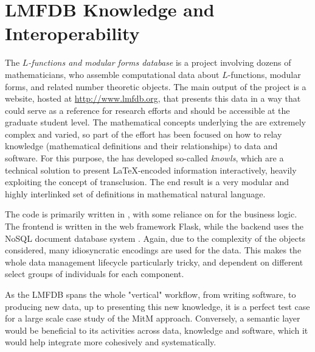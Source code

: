 \section{LMFDB Knowledge and Interoperability}\label{sec:lmfdb}
The \emph{$L$-functions and modular forms database} is a project involving dozens of
mathematicians, who assemble computational data about $L$-functions, modular forms, and
related number theoretic objects. The main output of the project is a website, hosted at
\url{http://www.lmfdb.org}, that presents this data in a way that could serve as a
reference for research efforts and should be accessible at the graduate student level.
The mathematical concepts underlying the \LMFDB are extremely complex and varied, so part
of the effort has been focused on how to relay knowledge (mathematical definitions and their
relationships) to data and software. For this purpose, the \LMFDB has developed so-called
\emph{knowls}, which are a technical solution to present \LaTeX-encoded information
interactively, heavily exploiting the concept of transclusion. The end result is a
very modular and highly interlinked set of definitions in mathematical natural language.


The \LMFDB code is primarily written in \Python, with some reliance on \Sage for
the business logic. The frontend is written in the web framework Flask, while the backend
uses the NoSQL document database system \Mongo \cite{lmfdb-repo}. Again, due to the
complexity of the objects considered, many idiosyncratic encodings are used for the
data. This makes the whole data management lifecycle particularly tricky, and dependent on
different select groups of individuals for each component.

As the LMFDB spans the whole "vertical" workflow, from writing software, to producing new
data, up to presenting this new knowledge, it is a perfect test case for a large scale
case study of the MitM approach. Conversely, a semantic layer would be beneficial to its
activities across data, knowledge and software, which it would help integrate more
cohesively and systematically.

